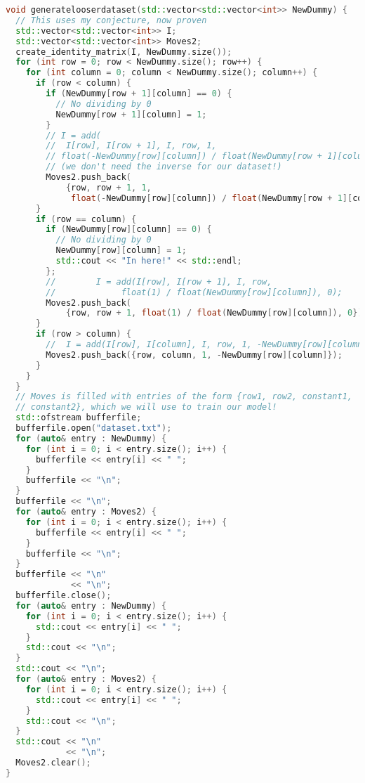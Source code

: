 \documentclass{article}
\begin{document}
\begin{lstlisting}[language=C++]
void generatelooserdataset(std::vector<std::vector<int>> NewDummy) {
  // This uses my conjecture, now proven
  std::vector<std::vector<int>> I;
  std::vector<std::vector<int>> Moves2;
  create_identity_matrix(I, NewDummy.size());
  for (int row = 0; row < NewDummy.size(); row++) {
    for (int column = 0; column < NewDummy.size(); column++) {
      if (row < column) {
        if (NewDummy[row + 1][column] == 0) {
          // No dividing by 0
          NewDummy[row + 1][column] = 1;
        }
        // I = add(
        //  I[row], I[row + 1], I, row, 1,
        // float(-NewDummy[row][column]) / float(NewDummy[row + 1][column]));
        // (we don't need the inverse for our dataset!)
        Moves2.push_back(
            {row, row + 1, 1,
             float(-NewDummy[row][column]) / float(NewDummy[row + 1][column])});
      }
      if (row == column) {
        if (NewDummy[row][column] == 0) {
          // No dividing by 0
          NewDummy[row][column] = 1;
          std::cout << "In here!" << std::endl;
        };
        //        I = add(I[row], I[row + 1], I, row,
        //             float(1) / float(NewDummy[row][column]), 0);
        Moves2.push_back(
            {row, row + 1, float(1) / float(NewDummy[row][column]), 0});
      }
      if (row > column) {
        //  I = add(I[row], I[column], I, row, 1, -NewDummy[row][column]);
        Moves2.push_back({row, column, 1, -NewDummy[row][column]});
      }
    }
  }
  // Moves is filled with entries of the form {row1, row2, constant1,
  // constant2}, which we will use to train our model!
  std::ofstream bufferfile;
  bufferfile.open("dataset.txt");
  for (auto& entry : NewDummy) {
    for (int i = 0; i < entry.size(); i++) {
      bufferfile << entry[i] << " ";
    }
    bufferfile << "\n";
  }
  bufferfile << "\n";
  for (auto& entry : Moves2) {
    for (int i = 0; i < entry.size(); i++) {
      bufferfile << entry[i] << " ";
    }
    bufferfile << "\n";
  }
  bufferfile << "\n"
             << "\n";
  bufferfile.close();
  for (auto& entry : NewDummy) {
    for (int i = 0; i < entry.size(); i++) {
      std::cout << entry[i] << " ";
    }
    std::cout << "\n";
  }
  std::cout << "\n";
  for (auto& entry : Moves2) {
    for (int i = 0; i < entry.size(); i++) {
      std::cout << entry[i] << " ";
    }
    std::cout << "\n";
  }
  std::cout << "\n"
            << "\n";
  Moves2.clear();
}


\end{lstlisting}
\end{document}
